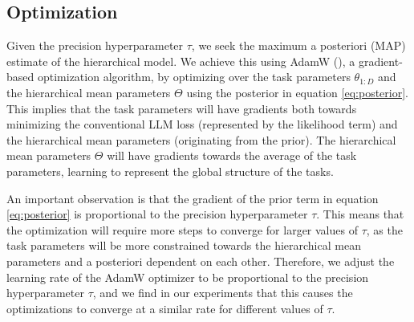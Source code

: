 \documentclass[fullpaper,final]{nldl}
\begin{document}
\subsection{Optimization}
Given the precision hyperparameter $\tau$, we seek the maximum a posteriori (MAP) estimate of the hierarchical model. We achieve this using AdamW (\cite{loshchilovDecoupledWeightDecay2018}), a gradient-based optimization algorithm, by optimizing over the task parameters $\theta_{1:D}$ and the hierarchical mean parameters $\Theta$ using the posterior in equation \ref{eq:posterior}. This implies that the task parameters will have gradients both towards minimizing the conventional LLM loss (represented by the likelihood term) and the hierarchical mean parameters (originating from the prior). The hierarchical mean parameters $\Theta$ will have gradients towards the average of the task parameters, learning to represent the global structure of the tasks.

An important observation is that the gradient of the prior term in equation \ref{eq:posterior} is proportional to the precision hyperparameter $\tau$. This means that the optimization will require more steps to converge for larger values of $\tau$, as the task parameters will be more constrained towards the hierarchical mean parameters and a posteriori dependent on each other. Therefore, we adjust the learning rate of the AdamW optimizer to be proportional to the precision hyperparameter $\tau$, and we find in our experiments that this causes the optimizations to converge at a similar rate for different values of $\tau$.
\end{document}
